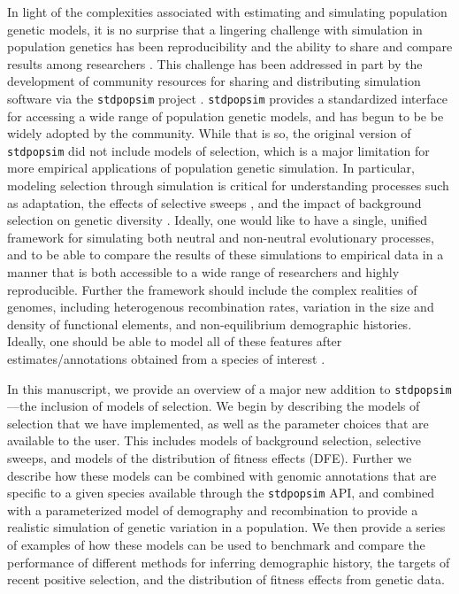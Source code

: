 \documentclass[hidelinks]{article}
\newcommand{\stdpopsim}{\texttt{stdpopsim}\xspace}
\begin{document}
    In light of the complexities associated with estimating and simulating
    population genetic models, it is no surprise that
    a lingering challenge with simulation in population genetics has been
    reproducibility and the ability to share and compare results among 
    researchers \citep[e.g.,][]{ragsdale2020lessons}.
    This challenge has been addressed in part by the development
    of community resources for sharing and distributing simulation software
    via the \stdpopsim project \citep{adrion2020community}. \stdpopsim
    provides a standardized interface for accessing a wide range of
    population genetic models, and has begun to be be widely adopted by the community. %
    While that is so, the original version of \stdpopsim did not include
    models of selection, which is a major limitation for more empirical
    applications of population genetic simulation. In particular, modeling selection
    through simulation is critical for understanding processes such
    as adaptation, the effects of selective sweeps \citep[e.g.][]{braverman1995hitchhiking,fay2000hitchhiking,przeworski2002signature,przeworski2005signature,schrider2015soft}, and the impact of
    background selection on genetic diversity
    \citep[e.g.][]{charlesworth1993effect,charlesworth1995pattern,williamson2002genealogy,ewing2016consequences,torres2020temporal}.
    Ideally, one would like
    to have a single, unified framework for simulating both neutral and
    non-neutral evolutionary processes, and to be able to compare the
    results of these simulations to empirical data in a manner that is
    both accessible to a wide range of researchers and highly reproducible. 
    Further the framework should include the complex realities of 
    genomes, including heterogenous recombination rates, 
    variation in the size and density of functional elements, and
    non-equilibrium demographic histories. Ideally, one should be able
    to model all of these features after estimates/annotations obtained
    from a species of interest \citep[e.g.][]{schrider2020background,rodrigues2024shared}.

    In this manuscript, we provide an overview of a major new addition
    to \stdpopsim---the inclusion of models of selection.
    We begin by describing the models of selection that we have implemented,
    as well as the parameter choices that are available to the user.
    This includes models of background selection, selective sweeps, and
    models of the distribution of fitness effects (DFE).
    Further we describe how these models can be combined with genomic
    annotations that are specific to a given species available
    through the \stdpopsim API, and combined with a parameterized model of
    demography and recombination to provide a realistic simulation of
    genetic variation in a population.
    We then provide a series of examples of how these models can be used
    to benchmark and compare the performance of different methods for
    inferring demographic history, the targets of recent positive selection,
    and the distribution of fitness effects from genetic data. 
\end{document}
